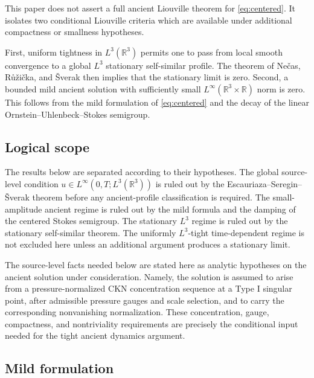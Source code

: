 \documentclass[11pt]{amsart}
\theoremstyle{plain}
\theoremstyle{definition}
\theoremstyle{remark}
\numberwithin{equation}{section}
\begin{document}
This paper does not assert a full ancient Liouville theorem for
\eqref{eq:centered}.  It isolates two conditional Liouville criteria which
are available under additional compactness or smallness hypotheses.

First, uniform tightness in \(L^3(\mathbb R^3)\) permits one to pass from
local smooth convergence to a global \(L^3\) stationary self-similar profile.
The theorem of Ne\v{c}as, R\r{u}\v{z}i\v{c}ka, and \v{S}verak
\cite{NRS1996} then implies that the stationary limit is zero.  Second, a
bounded mild ancient solution with sufficiently small
\(L^\infty(\mathbb R^3\times\mathbb R)\) norm is zero.  This follows from the
mild formulation of \eqref{eq:centered} and the decay of the linear
Ornstein--Uhlenbeck--Stokes semigroup.

\subsection{Logical scope}

The results below are separated according to their hypotheses.  The global
source-level condition
\(u\in L^\infty(0,T;L^3(\mathbb R^3))\) is ruled out by the
Escauriaza--Seregin--\v{S}verak theorem before any ancient-profile classification
is required.  The small-amplitude ancient regime is ruled out by the mild
formula and the damping of the centered Stokes semigroup.  The stationary
\(L^3\) regime is ruled out by the stationary self-similar theorem.  The
uniformly \(L^3\)-tight time-dependent regime is not excluded here unless an
additional argument produces a stationary limit.

The source-level facts needed below are stated here as analytic hypotheses on
the ancient solution under consideration.  Namely, the solution is assumed to
arise from a pressure-normalized CKN concentration sequence at a Type I
singular point, after admissible pressure gauges and scale selection, and to
carry the corresponding nonvanishing normalization.  These concentration,
gauge, compactness, and nontriviality requirements are precisely the
conditional input needed for the tight ancient dynamics argument.

\subsection{Mild formulation}
\end{document}
